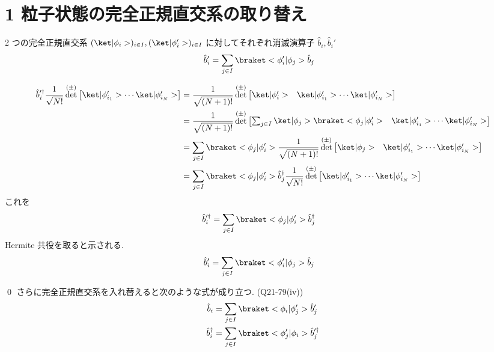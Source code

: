 \documentclass[uplatex,dvipdfmx,a4paper,11pt]{jlreq}
\makeatletter
\DeclareMathOperator{\Det}{det}
\numberwithin{equation}{section}
\theoremstyle{definition}
\renewenvironment{proof}[1][\proofname]{\par
  \normalfont
  \topsep6\p@\@plus6\p@ \trivlist
  \item[\hskip\labelsep{\bfseries #1}\@addpunct{\bfseries}]\ignorespaces\quad\par
}{
  \qed\endtrivlist\@endpefalse
}
\renewcommand\proofname{証明}
\makeatother
\begin{document}
\section{1 粒子状態の完全正規直交系の取り替え}
\begin{theorem}[Q21-79(i)(ii)(iii)]
  2 つの完全正規直交系 $(\ket|\phi_i>)_{i\in I}, (\ket|\phi_i'>)_{i\in I}$ に対してそれぞれ消滅演算子 $\hat{b}_i, \hat{b}_i'$
  \begin{align}
    \hat{b}_i' & = \sum_{j\in I}\braket<\phi_i'|\phi_j>\hat{b}_j
  \end{align}
\end{theorem}
\begin{proof}
  \begin{align}
    \hat{b}_i^{\prime\dagger}\frac{1}{\sqrt{N!}}\Det^{(\pm)}\begin{bmatrix}\ket|\phi_{i_1}'>\cdots\ket|\phi_{i_N}'>\end{bmatrix}
     & = \frac{1}{\sqrt{(N+1)!}}\Det^{(\pm)}\begin{bmatrix}\ket|\phi_i'> & \ket|\phi_{i_1}'>\cdots\ket|\phi_{i_N}'>\end{bmatrix}                                    \\
     & = \frac{1}{\sqrt{(N+1)!}}\Det^{(\pm)}\begin{bmatrix}\sum_{j\in I}\ket|\phi_j>\braket<\phi_j|\phi_i'> & \ket|\phi_{i_1}'>\cdots\ket|\phi_{i_N}'>\end{bmatrix} \\
     & = \sum_{j\in I}\braket<\phi_j|\phi_i'>\frac{1}{\sqrt{(N+1)!}}\Det^{(\pm)}\begin{bmatrix}\ket|\phi_j> & \ket|\phi_{i_1}'>\cdots\ket|\phi_{i_N}'>\end{bmatrix} \\
     & = \sum_{j\in I}\braket<\phi_j|\phi_i'>\hat{b}_j^\dagger\frac{1}{\sqrt{N!}}\Det^{(\pm)}\begin{bmatrix}\ket|\phi_{i_1}'>\cdots\ket|\phi_{i_N}'>\end{bmatrix}
  \end{align}
  これを
  \begin{align}
    \hat{b}_i^{\prime\dagger} & = \sum_{j\in I}\braket<\phi_j|\phi_i'>\hat{b}_j^\dagger
  \end{align}
  Hermite 共役を取ると示される.
  \begin{align}
    \hat{b}_i^{\prime} & = \sum_{j\in I}\braket<\phi_i'|\phi_j>\hat{b}_j
  \end{align}
\end{proof}
さらに完全正規直交系を入れ替えると次のような式が成り立つ. (Q21-79(iv))
\begin{align}
  \hat{b}_i         & = \sum_{j\in I}\braket<\phi_i|\phi_j'>\hat{b}_j'                \\
  \hat{b}_i^\dagger & = \sum_{j\in I}\braket<\phi_j'|\phi_i>\hat{b}_j^{\prime\dagger}
\end{align}
\end{document}

